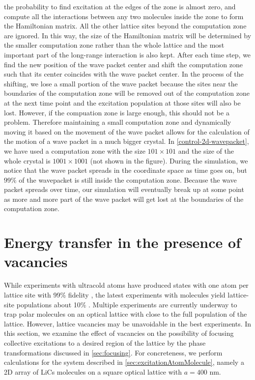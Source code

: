 the probability to find excitation at the edges of the zone is almost zero, and
compute all the interactions between any two molecules inside the zone to form the Hamiltonian matrix. All the 
other lattice sites beyond the computation zone are ignored. 
In this way, the size of the Hamiltonian matrix will be determined by the smaller computation 
zone rather than the whole lattice and the most important part of the long-range interaction is also kept. After each
time step, we find the new position of the wave packet center and shift the computation zone such that its 
center coincides with the wave packet center. In the process of the shifting, we lose a small portion of the
wave packet because the sites near the boundaries of the computation zone will be removed out of the computation
zone at the next time point and the excitation population at those sites will also be lost. However, if the compuation 
zone is large enough, this should not be a problem. 
Therefore maintaining a small computation zone and dynamically moving it  based on 
the movement of the wave packet allows for the calculation of the motion of  a wave packet in a much bigger crystal.  
In \autoref{control-2d-wavepacket}, we have used a computation zone with the size $101\times101$ and 
the size of the whole crystal is $1001 \times 1001$ (not shown in the figure). During the simulation, we notice that
the wave packet spreads in the coordinate space as time goes on, but $99\%$ of the wavepacket is still inside the
computation zone. Because the wave packet spreads over time, our simulation will eventually break up at some point 
as more and more part of the wave packet will get lost at the boundaries of the computation zone. 



\section{Energy transfer in the presence of vacancies}
\label{sec:energyTransferVacancy}

While experiments with ultracold atoms have produced states with one atom per lattice site with  99\%  fidelity \cite{atom-mott1, atom-mott2, atom-mott3},
the latest experiments with molecules yield lattice-site populations about  10\% \cite{Ye-arrays-PRL12}.
Multiple experiments are currently underway to  trap polar molecules on an optical lattice with close to the full population of the lattice.
However, lattice vacancies may be unavoidable in the best experiments. In this section, we examine the effect of vacancies on the possibility of focusing collective excitations
to a desired region of the lattice by the phase transformations discussed in \autoref{sec:focusing}. For concreteness, we perform calculations for the system described in \autoref{sec:excitationAtomMolecule},
namely a 2D array of LiCs molecules on a square optical lattice with $a=400$ nm.



